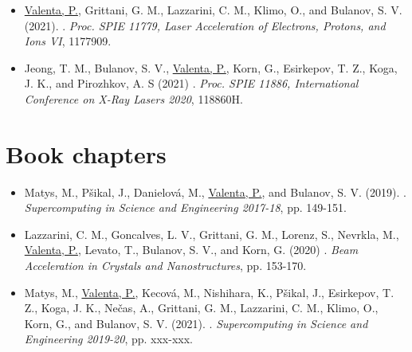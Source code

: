 \documentclass[10pt, twoside, a4paper, openright]{report}
\newcommand{\link}[3][blue]{\href{#2}{\color{#1}{#3}}}%
\begin{document}
\begin{itemize}
	\item \underline{Valenta, P.}, Grittani, G. M., Lazzarini, C. M., Klimo, O., and Bulanov, S. V. (2021). \link{http://dx.doi.org/10.1117/12.2589222}{Ring-shaped electron beams from laser-wakefield accelerator}. \textit{Proc. SPIE 11779, Laser Acceleration of Electrons, Protons, and Ions VI}, 1177909.
	
	\item Jeong, T. M., Bulanov, S. V., \underline{Valenta, P.}, Korn, G., Esirkepov, T. Z., Koga, J. K., and Pirozhkov, A. S (2021) \link{http://dx.doi.org/10.1117/12.2592047}{Ultra-strong attosecond laser focus produced by a relativistic-flying parabolic mirror}. \textit{Proc. SPIE 11886, International Conference on X-Ray Lasers 2020}, 118860H.
	
\end{itemize}

\section{Book chapters \label{sec:book_chapters}}

\begin{itemize}
	
	\item Matys, M., Pšikal, J., Danielová, M., \underline{Valenta, P.}, and Bulanov, S. V. (2019). \link{https://www.it4i.cz/cs/file/abd1875ff7d0e6f59799c4f470545516/173/Supercomputing-in-Science-and-Engineering_preview.pdf}{Laser-driven ion acceleration using cryogenic hydrogen targets}. \textit{Supercomputing in Science and Engineering 2017-18}, pp. 149-151.
	
	\item Lazzarini, C. M., Goncalves, L. V., Grittani, G. M., Lorenz, S., Nevrkla, M., \underline{Valenta, P.}, Levato, T., Bulanov, S. V., and Korn, G. (2020) \link{http://dx.doi.org/10.1142/9789811217135_0010}{Electron acceleration at ELI Beamlines: towards high-energy and high-repetition-rate accelerators}. \textit{Beam Acceleration in Crystals and Nanostructures}, pp. 153-170.
	
	\item Matys, M., \underline{Valenta, P.}, Kecová, M., Nishihara, K., Pšikal, J., Esirkepov, T. Z., Koga, J. K., Nečas, A., Grittani, G. M., Lazzarini, C. M., Klimo, O., Korn, G., and Bulanov, S. V. (2021). \link{}{Laser-driven acceleration of charged particles}. \textit{Supercomputing in Science and Engineering 2019-20}, pp. xxx-xxx.
	
\end{itemize}
\end{document}
